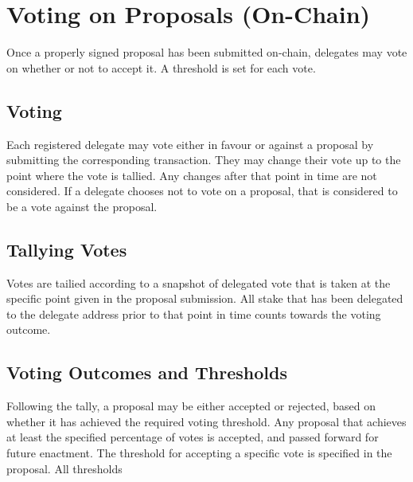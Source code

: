 \section{Voting on Proposals (On-Chain)}
\label{sect:voting}

Once a properly signed proposal has been submitted on-chain, delegates may vote on whether or not to accept it.  A threshold is set for each vote.

\subsection{Voting}

Each registered delegate may vote either in favour or against a proposal by submitting the corresponding transaction.  They may change their vote up to the point
where the vote is tallied.  Any changes after that point in time are not considered.  If a delegate chooses not to vote on a proposal, that is considered to be
a vote against the proposal.



\subsection{Tallying Votes}

Votes are tailied according to a snapshot of delegated vote that is taken at the specific point given in the proposal submission. All stake that has been delegated to the delegate address
prior to that point in time counts towards the voting outcome.

\subsection{Voting Outcomes and Thresholds}

Following the tally, a proposal may be either accepted or rejected, based on whether it has achieved the required voting threshold.  Any proposal that achieves at least
the specified percentage of votes is accepted, and passed forward for future enactment.
The threshold for accepting a specific vote is specified in the proposal.
All thresholds
